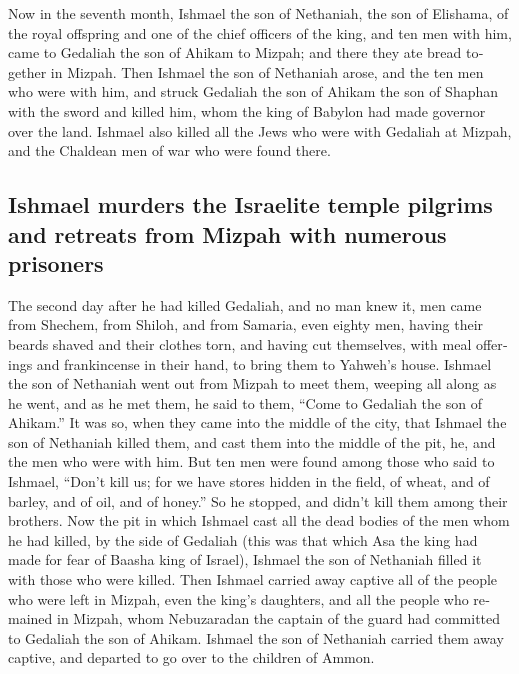 \begin{paracol}{2}
\begin{otherlanguage}{english}
 Now in the seventh month, Ishmael the son of Nethaniah,
the son of Elishama, of the royal offspring and one of the chief
officers of the king, and ten men with him, came to Gedaliah the son of
Ahikam to Mizpah; and there they ate bread together in Mizpah.
 Then Ishmael the son of Nethaniah arose, and the ten men
who were with him, and struck Gedaliah the son of Ahikam the son of
Shaphan with the sword and killed him, whom the king of Babylon had made
governor over the land.  Ishmael also killed all the Jews
who were with Gedaliah at Mizpah, and the Chaldean men of war who were
found there.

\hypertarget{ishmael-murders-the-israelite-temple-pilgrims-and-retreats-from-mizpah-with-numerous-prisoners}{%
\subsection{Ishmael murders the Israelite temple pilgrims and retreats
from Mizpah with numerous
prisoners}\label{ishmael-murders-the-israelite-temple-pilgrims-and-retreats-from-mizpah-with-numerous-prisoners}}

 The second day after he had killed Gedaliah, and no man
knew it,  men came from Shechem, from Shiloh, and from
Samaria, even eighty men, having their beards shaved and their clothes
torn, and having cut themselves, with meal offerings and frankincense in
their hand, to bring them to Yahweh's house.  Ishmael the
son of Nethaniah went out from Mizpah to meet them, weeping all along as
he went, and as he met them, he said to them, ``Come to Gedaliah the son
of Ahikam.''  It was so, when they came into the middle of
the city, that Ishmael the son of Nethaniah killed them, and cast them
into the middle of the pit, he, and the men who were with him.
 But ten men were found among those who said to Ishmael,
``Don't kill us; for we have stores hidden in the field, of wheat, and
of barley, and of oil, and of honey.'' So he stopped, and didn't kill
them among their brothers.  Now the pit in which Ishmael
cast all the dead bodies of the men whom he had killed, by the side of
Gedaliah (this was that which Asa the king had made for fear of Baasha
king of Israel), Ishmael the son of Nethaniah filled it with those who
were killed.  Then Ishmael carried away captive all of
the people who were left in Mizpah, even the king's daughters, and all
the people who remained in Mizpah, whom Nebuzaradan the captain of the
guard had committed to Gedaliah the son of Ahikam. Ishmael the son of
Nethaniah carried them away captive, and departed to go over to the
children of Ammon.


\end{otherlanguage}
\end{paracol}
